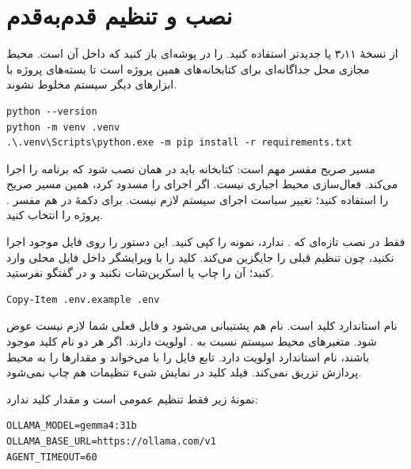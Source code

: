 \chapter{نصب و تنظیم قدم‌به‌قدم}

از 
 نسخهٔ ۳٫۱۱ یا جدیدتر استفاده کنید. 
 را در پوشه‌ای باز کنید که 
 داخل آن است. محیط مجازی محل جداگانه‌ای برای کتابخانه‌های همین پروژه است تا بسته‌های پروژه با ابزارهای دیگر سیستم مخلوط نشوند.

\begin{LTR}
\begin{Verbatim}[breaklines,breakanywhere,fontsize=\small]
python --version
python -m venv .venv
.\.venv\Scripts\python.exe -m pip install -r requirements.txt
\end{Verbatim}
\end{LTR}

مسیر صریح مفسر مهم است: کتابخانه باید در همان 
 نصب شود که برنامه را اجرا می‌کند. فعال‌سازی محیط اجباری نیست. اگر 
 اجرای 
 را مسدود کرد، همین مسیر صریح را استفاده کنید؛ تغییر سیاست اجرای سیستم لازم نیست. برای دکمهٔ 
 در 
 هم مفسر .
 پروژه را انتخاب کنید.

فقط در نصب تازه‌ای که .
 ندارد، نمونه را کپی کنید. این دستور را روی فایل موجود اجرا نکنید، چون تنظیم قبلی را جایگزین می‌کند. کلید را با ویرایشگر داخل فایل محلی وارد کنید؛ آن را چاپ یا اسکرین‌شات نکنید و در گفتگو نفرستید.

\begin{LTR}
\begin{Verbatim}[breaklines,breakanywhere,fontsize=\small]
Copy-Item .env.example .env
\end{Verbatim}
\end{LTR}

نام استاندارد کلید 
 است. نام 
 هم پشتیبانی می‌شود و فایل فعلی شما لازم نیست عوض شود. متغیرهای محیط سیستم نسبت به .
 اولویت دارند. اگر هر دو نام کلید موجود باشند، نام استاندارد اولویت دارد. تابع 
 فایل را با 
 می‌خواند و مقدارها را به محیط پردازش تزریق نمی‌کند. فیلد کلید در نمایش شیء تنظیمات هم چاپ نمی‌شود.

نمونهٔ زیر فقط تنظیم عمومی است و مقدار کلید ندارد:

\begin{LTR}
\begin{Verbatim}[breaklines,breakanywhere,fontsize=\small]
OLLAMA_MODEL=gemma4:31b
OLLAMA_BASE_URL=https://ollama.com/v1
AGENT_TIMEOUT=60
\end{Verbatim}
\end{LTR}

